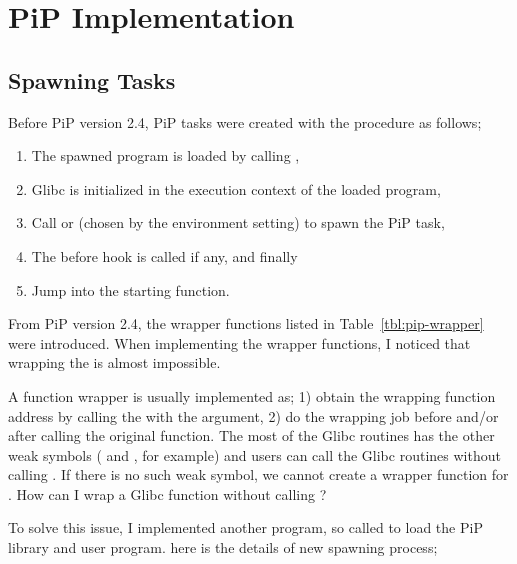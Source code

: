 
\section{PiP Implementation}

\subsection{Spawning Tasks}\label{sec:spawn-details}

Before PiP version 2.4, PiP tasks were created with the procedure as
follows;

\begin{enumerate}
\item The spawned program is loaded by calling ,
\item Glibc is initialized in the execution context of the loaded
  program,
\item Call  or  (chosen
  by the  environment setting) to spawn the PiP task,
\item The before hook is called if any, and finally
\item Jump into the starting function.
\end{enumerate}

From PiP version 2.4, the wrapper functions listed in
Table~\ref{tbl:pip-wrapper} were introduced. When implementing the
wrapper functions, I noticed that wrapping the  is
almost impossible.

A function wrapper is usually implemented as; 1) obtain the wrapping
function address by calling the  with the
argument, 2) do the wrapping job before and/or after calling the
original function. The most of the Glibc  routines has
the other weak symbols ( and
, for example) and users can call the Glibc
 routines without  
calling . If there is no such weak symbol, we cannot
create a wrapper function for . How can I
wrap a Glibc function without calling ?

To solve this issue, I implemented another program, so called
 to load the PiP library and user program. here is
the details of new spawning process;


